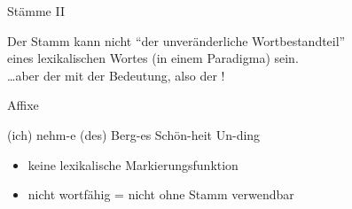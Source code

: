 \begin{frame}
  {Stämme II}
  \begin{exe}
    \ex
    \begin{xlist}
        \pause
        \pause
    \end{xlist}
  \end{exe}
  \pause
  \pause
  \pause
  \pause
  \pause
  Der \alert{Stamm} kann nicht "`der unveränderliche Wortbestandteil"'\\
  eines lexikalischen Wortes (in einem Paradigma) sein.\\
  \Zeile
  \pause
  \alert{\dots aber der mit der Bedeutung, also der} !
\end{frame}

\begin{frame}
  {Affixe}
  \pause
  \begin{exe}
    \ex
    \begin{xlist}
      \ex (ich) nehm\alert<6->{-e}
      \pause
      \ex (des) Berg\alert<7->{-es}
      \pause
      \ex Schön\alert<8->{-heit}
      \pause
      \ex \alert<9->{Un-}ding
    \end{xlist}
  \end{exe}
  \Zeile
  \pause
  \pause
  \pause
  \pause
  \pause
  \begin{itemize}[<+->]
    \item \alert{keine lexikalische Markierungsfunktion}
    \item \alert{nicht wortfähig} = nicht ohne Stamm verwendbar
  \end{itemize}
\end{frame}

